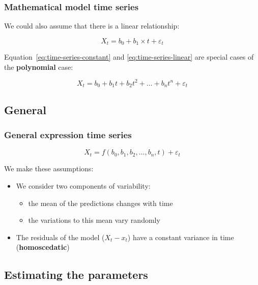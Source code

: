 \documentclass[aspectratio=169]{beamer}
\begin{document}
\begin{frame}
  \frametitle{Mathematical model time series}
  
  We could also assume that there is a linear relationship:
  
  \begin{equation}
  X_{t} = b_{0} + b_{1} \times t + \varepsilon_{t}
  \label{eq:time-series-linear}
  \end{equation}
  
  Equation~\ref{eq:time-series-constant} and \ref{eq:time-series-linear} are special cases of the \textbf{polynomial} case:
  
  \begin{equation}
  X_{t} = b_{0} + b_{1} t + b_{2} t^{2} + \dots + b_{n} t^{n} + \varepsilon_{t}
  \label{eq:time-series-polynomial}
  \end{equation}
\end{frame}

\subsection{General}

\begin{frame}
  \frametitle{General expression time series}
  
  \begin{equation}
  X_{t} = f(b_{0}, b_{1}, b_{2}, \dots , b_{n}, t) + \varepsilon_{t}
  \label{eq:time-series-general}
  \end{equation}
  
  We make these assumptions:
  
  \begin{itemize}
    \item We consider two components of variability:
    \begin{itemize}
      \item the mean of the predictions changes with time
      \item the variations to this mean vary randomly
    \end{itemize}
    \item The residuals of the model ($X_t - x_t$) have a constant variance in time (\textbf{homoscedatic})
  \end{itemize}
\end{frame}

\subsection{Estimating the parameters}
\end{document}
